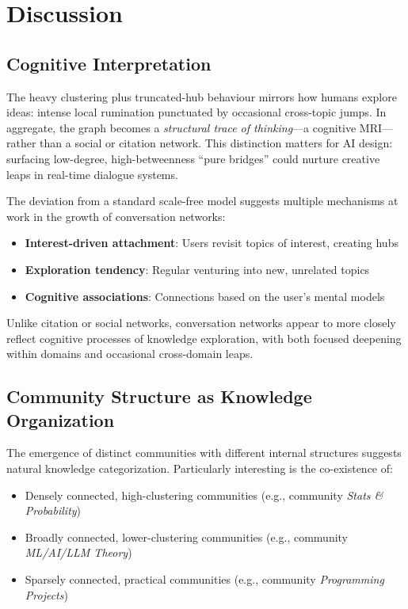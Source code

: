 \documentclass[10pt, a4paper]{article}
\begin{document}
\section{Discussion}

\subsection{Cognitive Interpretation}

The heavy clustering plus truncated-hub behaviour mirrors how humans
explore ideas: intense local rumination punctuated by occasional
cross-topic jumps. In aggregate, the graph becomes a
\emph{structural trace of thinking}---a cognitive MRI---rather than a
social or citation network.  This distinction matters for AI design:
surfacing low-degree, high-betweenness ``pure bridges'' could nurture
creative leaps in real-time dialogue systems.

The deviation from a standard scale-free model suggests multiple mechanisms at work in the growth of conversation networks:

\begin{itemize}
    \item \textbf{Interest-driven attachment}: Users revisit topics of interest, creating hubs
    \item \textbf{Exploration tendency}: Regular venturing into new, unrelated topics
    \item \textbf{Cognitive associations}: Connections based on the user's mental models
\end{itemize}

Unlike citation or social networks, conversation networks appear to more closely reflect cognitive processes of knowledge exploration, with both focused deepening within domains and occasional cross-domain leaps.

\subsection{Community Structure as Knowledge Organization}

The emergence of distinct communities with different internal structures suggests natural knowledge categorization. Particularly interesting is the co-existence of:

\begin{itemize}
    \item Densely connected, high-clustering communities (e.g., community \emph{Stats \& Probability})
    \item Broadly connected, lower-clustering communities (e.g., community \emph{ML/AI/LLM Theory})
    \item Sparsely connected, practical communities (e.g., community \emph{Programming Projects})
\end{itemize}
\end{document}
